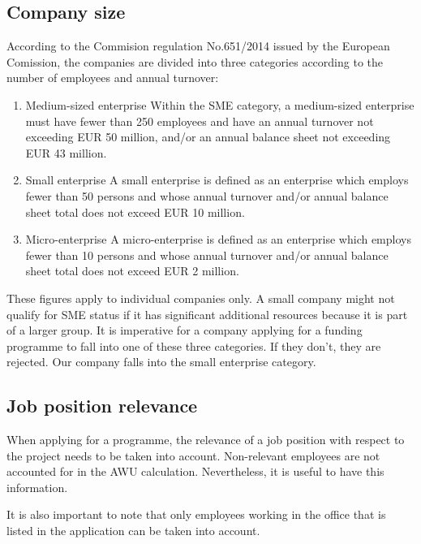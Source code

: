 \documentclass[12pt,oneside]{fithesis2}
\begin{document}
\subsection{Company size}
\noindent
According to the Commision regulation No.651/2014 \cite[page~70]{eu-commision-regulation} issued by the European Comission, the companies are divided into three categories according to the number of employees and annual turnover:
\begin{enumerate}
    \item Medium-sized enterprise
    \newline\newline
    Within the SME category, a medium-sized enterprise must have fewer than 250 employees and have an annual turnover not exceeding EUR 50 million, and/or an annual balance sheet not exceeding EUR 43 million.
    \item Small enterprise
    \newline\newline
    A small enterprise is defined as an enterprise which employs fewer than 50 persons and whose annual turnover and/or annual balance sheet total does not exceed EUR 10 million.
    \item Micro-enterprise
    \newline\newline
    A micro-enterprise is defined as an enterprise which employs fewer than 10 persons and whose annual turnover and/or annual balance sheet total does not exceed EUR 2 million.
\end{enumerate}
These figures apply to individual companies only. A small company might not qualify for SME status if it has significant additional resources because it is part of a larger group. \cite{eu-commision-regulation}
It is imperative for a company applying for a funding programme to fall into one of these three categories. If they don't, they are rejected. Our company falls into the small enterprise category.
\subsection{Job position relevance}
When applying for a programme, the relevance of a job position with respect to the project needs to be taken into account. Non-relevant employees are not accounted for in the AWU calculation. Nevertheless, it is useful to have this information.

It is also important to note that only employees working in the office that is listed in the application can be taken into account.\cite[page~30]{czech-rules}
\end{document}
